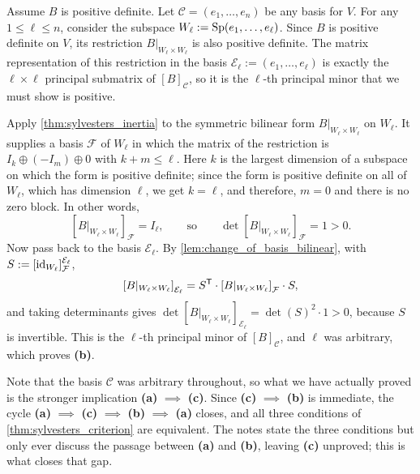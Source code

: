 \begin{exercisesolution}
\label{sol:sylvester_criterion_forward}
Assume $B$ is positive definite. Let $\mathcal{C} = (e_1, \dots, e_n)$ be any basis for $V$. For any $1 \le \ell \le n$, consider the subspace $W_\ell := \operatorname{Sp}(e_1, \dots, e_\ell)$. Since $B$ is positive definite on $V$, its restriction $B|_{W_\ell \times W_\ell}$ is also positive definite. The matrix representation of this restriction in the basis $\mathcal{E}_\ell := (e_1, \dots, e_\ell)$ is exactly the $\ell \times \ell$ principal submatrix of $[B]_{\mathcal{C}}$, so it is the $\ell$-th principal minor that we must show is positive.

Apply \cref{thm:sylvesters_inertia} to the symmetric bilinear form $B|_{W_\ell \times W_\ell}$ on $W_\ell$. It supplies a basis $\mathcal{F}$ of $W_\ell$ in which the matrix of the restriction is $I_k \oplus (-I_m) \oplus 0$ with $k + m \le \ell$. Here $k$ is the largest dimension of a subspace on which the form is positive definite; since the form is positive definite on all of $W_\ell$, which has dimension $\ell$, we get $k = \ell$, and therefore, $m = 0$ and there is no zero block. In other words,
\[ \left[B|_{W_\ell \times W_\ell}\right]_{\mathcal{F}} = I_\ell, \qquad \text{so} \qquad \det\left[B|_{W_\ell \times W_\ell}\right]_{\mathcal{F}} = 1 > 0. \]
Now pass back to the basis $\mathcal{E}_\ell$. By \cref{lem:change_of_basis_bilinear}, with $S := [\operatorname{id}_{W_\ell}]_{\mathcal{F}}^{\mathcal{E}_\ell}$,
\[ \left[B|_{W_\ell \times W_\ell}\right]_{\mathcal{E}_\ell} = S^{\mathsf{T}} \cdot \left[B|_{W_\ell \times W_\ell}\right]_{\mathcal{F}} \cdot S, \]
and taking determinants gives $\det\left[B|_{W_\ell \times W_\ell}\right]_{\mathcal{E}_\ell} = \det(S)^2 \cdot 1 > 0$, because $S$ is invertible. This is the $\ell$-th principal minor of $[B]_{\mathcal{C}}$, and $\ell$ was arbitrary, which proves \textbf{(b)}.

Note that the basis $\mathcal{C}$ was arbitrary throughout, so what we have actually proved is the stronger implication \textbf{(a)} $\implies$ \textbf{(c)}. Since \textbf{(c)} $\implies$ \textbf{(b)} is immediate, the cycle \textbf{(a)} $\implies$ \textbf{(c)} $\implies$ \textbf{(b)} $\implies$ \textbf{(a)} closes, and all three conditions of \cref{thm:sylvesters_criterion} are equivalent. The notes state the three conditions but only ever discuss the passage between \textbf{(a)} and \textbf{(b)}, leaving \textbf{(c)} unproved; this is what closes that gap.
\end{exercisesolution}

